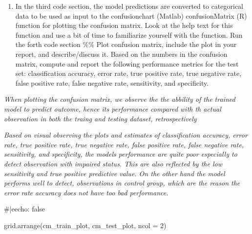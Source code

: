 \documentclass[
  letterpaper,
  DIV=11,
  numbers=noendperiod]{scrartcl}
\newenvironment{Shaded}{\begin{snugshade}}{\end{snugshade}}
\newcommand{\AttributeTok}[1]{\textcolor[rgb]{0.40,0.45,0.13}{#1}}
\newcommand{\CommentTok}[1]{\textcolor[rgb]{0.37,0.37,0.37}{#1}}
\newcommand{\DecValTok}[1]{\textcolor[rgb]{0.68,0.00,0.00}{#1}}
\newcommand{\FunctionTok}[1]{\textcolor[rgb]{0.28,0.35,0.67}{#1}}
\newcommand{\NormalTok}[1]{\textcolor[rgb]{0.00,0.23,0.31}{#1}}
\providecommand{\tightlist}{%
  \setlength{\itemsep}{0pt}\setlength{\parskip}{0pt}}\usepackage{longtable,booktabs,array}
\begin{document}
\begin{enumerate}
\def\labelenumi{(\alph{enumi})}
\setcounter{enumi}{3}
\tightlist
\item
  In the third code section, the model predictions are converted to
  categorical data to be used as input to the confusionchart (Matlab)
  confusionMatrix (R) function for plotting the confusion matrix. Look
  at the help text for this function and use a bit of time to
  familiarize yourself with the function. Run the forth code section
  \%\% Plot confusion matrix, include the plot in your report, and
  describe/discuss it. Based on the numbers in the confusion matrix,
  compute and report the following performance metrics for the test set:
  classification accuracy, error rate, true positive rate, true negative
  rate, false positive rate, false negative rate, sensitivity, and
  specificity.
\end{enumerate}

\emph{When plotting the confusion matrix, we observe the the abbility of
the trained model to predict outcome, hence its performance compared
with th actual observation in both the traing and testing dataset,
retrospectively}

\emph{Based on visual observing the plots and estimates of
classification accuracy, error rate, true positive rate, true negative
rate, false positive rate, false negative rate, sensitivity, and
specificity, the models performance are quite poor especially to detect
observation with impaired status. This are also reflected by the low
sensitivity and true positive predictive value. On the other hand the
model performs well to detect, observations in control group, which are
the reason the error rate accuracy does not have too bad performance.}

\begin{Shaded}
\begin{Highlighting}[]
\CommentTok{\#|eecho: false}

\FunctionTok{grid.arrange}\NormalTok{(cm\_train\_plot, cm\_test\_plot, }\AttributeTok{ncol =} \DecValTok{2}\NormalTok{)}
\end{Highlighting}
\end{Shaded}
\end{document}
